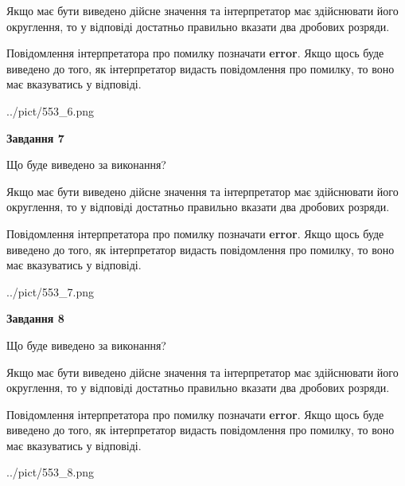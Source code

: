 \documentclass[12pt, ukrainian]{article}
\begin{document}
{\begin {Large}
Якщо має бути виведено дійсне значення та інтерпретатор має здійснювати його округлення, 
то у відповіді достатньо правильно вказати два дробових розряди.

Повідомлення інтерпретатора про помилку позначати \textbf{error}.
Якщо щось буде виведено до того, як інтерпретатор видасть повідомлення про помилку, 
то воно має вказуватись у відповіді. \par

\begin{center}
	{../pict/553_6.png}
\end{center}
\newpage

{\begin {center}\textbf{Завдання 7}\end {center}}\par
Що буде виведено за виконання? \par

Якщо має бути виведено дійсне значення та інтерпретатор має здійснювати його округлення, 
то у відповіді достатньо правильно вказати два дробових розряди.

Повідомлення інтерпретатора про помилку позначати \textbf{error}.
Якщо щось буде виведено до того, як інтерпретатор видасть повідомлення про помилку, 
то воно має вказуватись у відповіді. \par

\begin{center}
	{../pict/553_7.png}
\end{center}
\newpage

{\begin {center}\textbf{Завдання 8}\end {center}}\par
Що буде виведено за виконання? \par

Якщо має бути виведено дійсне значення та інтерпретатор має здійснювати його округлення, 
то у відповіді достатньо правильно вказати два дробових розряди.

Повідомлення інтерпретатора про помилку позначати \textbf{error}.
Якщо щось буде виведено до того, як інтерпретатор видасть повідомлення про помилку, 
то воно має вказуватись у відповіді. \par

\begin{center}
	{../pict/553_8.png}
\end{center}
\newpage


\end{Large}}
\end{document}
